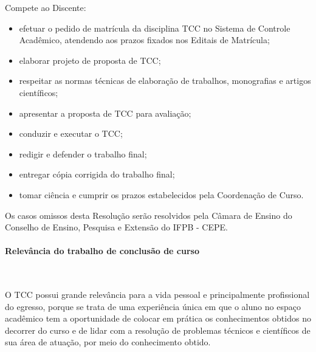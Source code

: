 Compete ao Discente: 

\begin{itemize}
	\item efetuar o pedido de matrícula da disciplina TCC no Sistema de Controle Acadêmico, atendendo aos prazos fixados nos Editais de Matrícula; 

	\item elaborar projeto de proposta de TCC;

	\item respeitar as normas técnicas de elaboração de trabalhos, monografias e artigos científicos; 

	\item apresentar a proposta de TCC para avaliação; 

	\item conduzir e executar o TCC; 

	\item redigir e defender o trabalho final; 

	\item entregar cópia corrigida do trabalho final; 

	\item tomar ciência e cumprir os prazos estabelecidos pela Coordenação de Curso. 
\end{itemize}

Os casos omissos desta Resolução serão resolvidos pela Câmara de Ensino do Conselho de Ensino, Pesquisa e Extensão do IFPB - CEPE. 

\paragraph{Relevância do trabalho de conclusão de curso}\
 
       O TCC possui grande relevância para a vida pessoal e principalmente profissional do egresso, porque se trata de uma experiência única em que o aluno no espaço acadêmico tem a oportunidade de colocar em prática os conhecimentos obtidos no decorrer do curso e de lidar com a resolução de problemas técnicos e científicos de sua área de atuação, por meio do conhecimento obtido.


